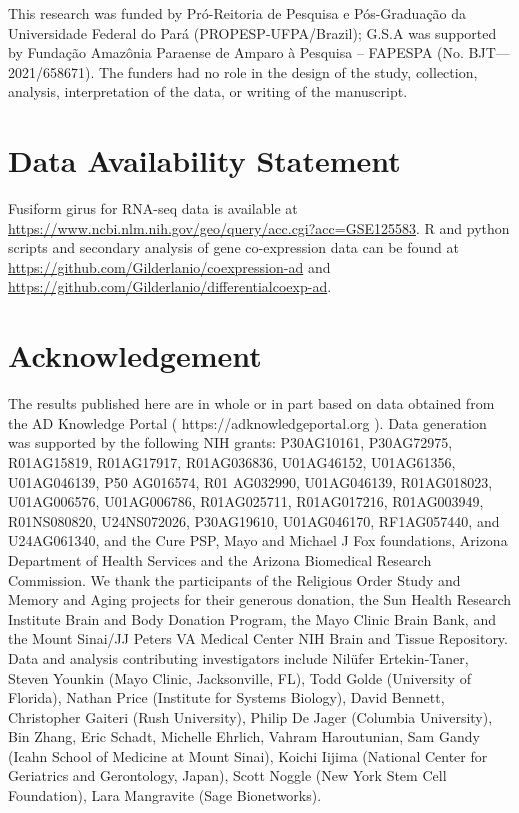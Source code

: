 \documentclass[utf8]{FrontiersinHarvard} %
\begin{document}
This research was funded by Pró-Reitoria de Pesquisa e Pós-Graduação da Universidade Federal do Pará (PROPESP-UFPA/Brazil); G.S.A was supported by Fundação Amazônia Paraense de Amparo à Pesquisa – FAPESPA (No. BJT—2021/658671). The funders had no role in the design of the study, collection, analysis, interpretation of the data, or writing of the manuscript.

\section*{Data Availability Statement}

Fusiform girus for RNA-seq data is available at \url{https://www.ncbi.nlm.nih.gov/geo/query/acc.cgi?acc=GSE125583}. R and python scripts and secondary analysis of gene co-expression data can be found at \url{https://github.com/Gilderlanio/coexpression-ad} and \url{https://github.com/Gilderlanio/differentialcoexp-ad}.

\section*{Acknowledgement}

The results published here are in whole or in part based on data obtained from the AD Knowledge Portal ( https://adknowledgeportal.org ). Data generation was supported by the following NIH grants: P30AG10161, P30AG72975, R01AG15819, R01AG17917, R01AG036836, U01AG46152, U01AG61356, U01AG046139, P50 AG016574, R01 AG032990, U01AG046139, R01AG018023, U01AG006576, U01AG006786, R01AG025711, R01AG017216, R01AG003949, R01NS080820, U24NS072026, P30AG19610, U01AG046170, RF1AG057440, and U24AG061340, and the Cure PSP, Mayo and Michael J Fox foundations, Arizona Department of Health Services and the Arizona Biomedical Research Commission. We thank the participants of the Religious Order Study and Memory and Aging projects for their generous donation, the Sun Health Research Institute Brain and Body Donation Program, the Mayo Clinic Brain Bank, and the Mount Sinai/JJ Peters VA Medical Center NIH Brain and Tissue Repository. Data and analysis contributing investigators include Nilüfer Ertekin-Taner, Steven Younkin (Mayo Clinic, Jacksonville, FL), Todd Golde (University of Florida), Nathan Price (Institute for Systems Biology), David Bennett, Christopher Gaiteri (Rush University), Philip De Jager (Columbia University), Bin Zhang, Eric Schadt, Michelle Ehrlich, Vahram Haroutunian, Sam Gandy (Icahn School of Medicine at Mount Sinai), Koichi Iijima (National Center for Geriatrics and Gerontology, Japan), Scott Noggle (New York Stem Cell Foundation), Lara Mangravite (Sage Bionetworks).
\end{document}
